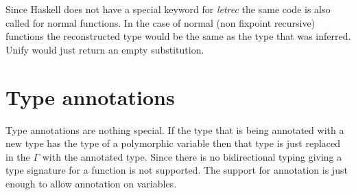 Since Haskell does not have a special keyword for \emph{letrec} the same code is also called for normal functions. In the case of normal (non fixpoint recursive) functions the reconstructed type would be the same as the type that was inferred. Unify would just return an empty substitution.

\section{Type annotations}
Type annotations are nothing special. If the type that is being annotated with a new type has the type of a polymorphic variable then that type is just replaced in the $\Gamma$ with the annotated type. Since there is no bidirectional typing giving a type signature for a function is not supported. The support for annotation is just enough to allow annotation on variables.
